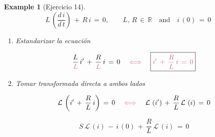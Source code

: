\documentclass[a4paper,11pt,openany]{book}
\newtheorem{exmp}{Example}[section]
\newcommand*{\itembolasazules}[1]{%
\footnotesize\protect\tikz[baseline=-3pt]%
\protect\node[scale=.7, circle, shade, ball
color=green]{\color{white}\Large\bf#1};}
\begin{document}
\begin{exmp}[Ejercicio 14]
 
$$L\,\left(\dfrac{d\,i}{d\,t} \right)\,+\,R\,i\,=\,0, \qquad L,\,R\,\in\,\mathbb{R} \quad \text{and} \quad i\,(0)\,=\,0$$
 
\begin{enumerate}[label=\itembolasazules{\arabic*}]
     
     
\item Estandarizar la ecuación 
     
$$\dfrac{L}{\textcolor{blush}{L}}\,i'\,+\,\dfrac{R}{\textcolor{blush}{L}}\,i\,=\,0 \quad \textcolor{blush}{\iff} \quad \boxed{\textcolor{blush}{i'\,+\,\dfrac{R}{L}\,i\,=\,0} } $$
     
\item Tomar transformada directa a ambos lados
     
$$\mathcal{L}\,\left(i'\,+\,\dfrac{R}{L}\,i \right)\,=\,0 \quad \textcolor{blush}{\iff} \quad \mathcal{L}\,\left(i' \right)\,+\,\dfrac{R}{L}\,\mathcal{L}\,\left(i \right)\,=\,0$$
     
$$S\,\mathcal{L}\,\left(i \right)\,-\,i\,(0)\,+\,\dfrac{R}{L}\,\mathcal{L}\,\left(i \right)\,=\,0$$
     
\end{enumerate}

\end{exmp}
 
\end{document}
